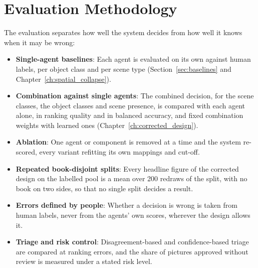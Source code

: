 \documentclass[12pt,a4paper]{report}
\begin{document}
\section{Evaluation Methodology}
The evaluation separates how well the system decides from how well it knows when it may be wrong:
\begin{itemize}
    \item \textbf{Single-agent baselines}: Each agent is evaluated on its own against human labels, per object class and per scene type (Section~\ref{sec:baselines} and Chapter~\ref{ch:spatial_collapse}).
    \item \textbf{Combination against single agents}: The combined decision, for the scene classes, the object classes and scene presence, is compared with each agent alone, in ranking quality and in balanced accuracy, and fixed combination weights with learned ones (Chapter~\ref{ch:corrected_design}).
    \item \textbf{Ablation}: One agent or component is removed at a time and the system re-scored, every variant refitting its own mappings and cut-off.
    \item \textbf{Repeated book-disjoint splits}: Every headline figure of the corrected design on the labelled pool is a mean over 200 redraws of the split, with no book on two sides, so that no single split decides a result.
    \item \textbf{Errors defined by people}: Whether a decision is wrong is taken from human labels, never from the agents' own scores, wherever the design allows it.
    \item \textbf{Triage and risk control}: Disagreement-based and confidence-based triage are compared at ranking errors, and the share of pictures approved without review is measured under a stated risk level.
\end{itemize}
\end{document}
